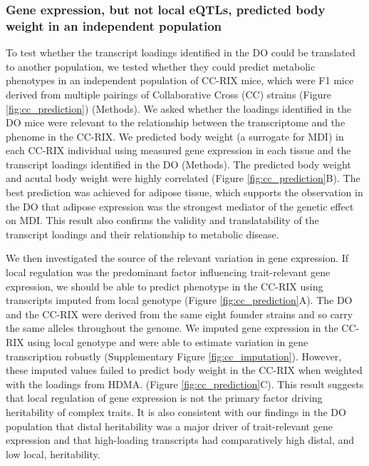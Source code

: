 \documentclass[
]{article}
\begin{document}
\subsubsection{Gene expression, but not local eQTLs, predicted body
weight in an independent
population}\label{gene-expression-but-not-local-eqtls-predicted-body-weight-in-an-independent-population}

To test whether the transcript loadings identified in the DO could be
translated to another population, we tested whether they could predict
metabolic phenotypes in an independent population of CC-RIX mice, which
were F1 mice derived from multiple pairings of Collaborative Cross (CC)
\cite{pmid28592495, pmid21411855, 
pmid17674098, pmid15514660} strains (Figure \ref{fig:cc_prediction})
(Methods). We asked whether the loadings identified in the DO mice were
relevant to the relationship between the transcriptome and the phenome
in the CC-RIX. We predicted body weight (a surrogate for MDI) in each
CC-RIX individual using measured gene expression in each tissue and the
transcript loadings identified in the DO (Methods). The predicted body
weight and acutal body weight were highly correlated (Figure
\ref{fig:cc_prediction}B). The best prediction was achieved for adipose
tissue, which supports the observation in the DO that adipose expression
was the strongest mediator of the genetic effect on MDI. This result
also confirms the validity and translatability of the transcript
loadings and their relationship to metabolic disease.

We then investigated the source of the relevant variation in gene
expression. If local regulation was the predominant factor influencing
trait-relevant gene expression, we should be able to predict phenotype
in the CC-RIX using transcripts imputed from local genotype (Figure
\ref{fig:cc_prediction}A). The DO and the CC-RIX were derived from the
same eight founder strains and so carry the same alleles throughout the
genome. We imputed gene expression in the CC-RIX using local genotype
and were able to estimate variation in gene transcription robustly
(Supplementary Figure \ref{fig:cc_imputation}). However, these imputed
values failed to predict body weight in the CC-RIX when weighted with
the loadings from HDMA. (Figure \ref{fig:cc_prediction}C). This result
suggests that local regulation of gene expression is not the primary
factor driving heritability of complex traits. It is also consistent
with our findings in the DO population that distal heritability was a
major driver of trait-relevant gene expression and that high-loading
transcripts had comparatively high distal, and low local, heritability.
\end{document}
